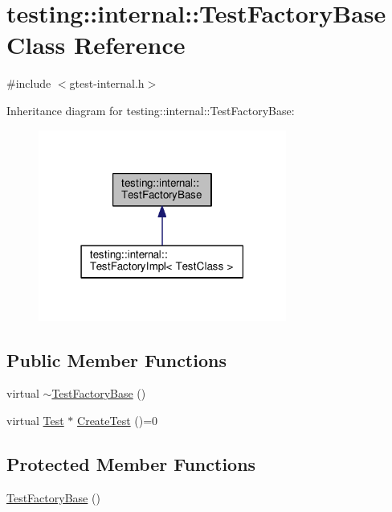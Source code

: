 \hypertarget{classtesting_1_1internal_1_1_test_factory_base}{}\section{testing\+:\+:internal\+:\+:Test\+Factory\+Base Class Reference}
\label{classtesting_1_1internal_1_1_test_factory_base}


{\ttfamily \#include $<$gtest-\/internal.\+h$>$}



Inheritance diagram for testing\+:\+:internal\+:\+:Test\+Factory\+Base\+:
\nopagebreak
\begin{figure}[H]
\begin{center}
\leavevmode
\includegraphics[width=231pt]{classtesting_1_1internal_1_1_test_factory_base__inherit__graph}
\end{center}
\end{figure}
\subsection*{Public Member Functions}
\begin{DoxyCompactItemize}
\item 
virtual \hyperlink{classtesting_1_1internal_1_1_test_factory_base_a18f22a7594336a36642289c1decddc9e}{$\sim$\+Test\+Factory\+Base} ()
\item 
virtual \hyperlink{classtesting_1_1_test}{Test} $\ast$ \hyperlink{classtesting_1_1internal_1_1_test_factory_base_a07ac3ca0b196cdb092da0bb186b7c030}{Create\+Test} ()=0
\end{DoxyCompactItemize}
\subsection*{Protected Member Functions}
\begin{DoxyCompactItemize}
\item 
\hyperlink{classtesting_1_1internal_1_1_test_factory_base_afedbf147b2a213517b315880d8c81427}{Test\+Factory\+Base} ()
\end{DoxyCompactItemize}


